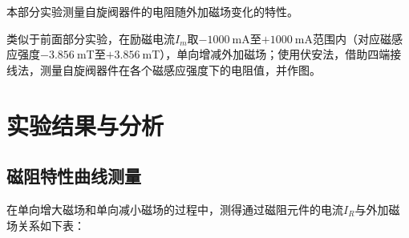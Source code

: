\documentclass{thuemp}
\begin{document}
本部分实验测量自旋阀器件的电阻随外加磁场变化的特性。

类似于前面部分实验，在励磁电流$I_m$取$-1000 ~ \mathrm{mA} $至$+1000~ \mathrm{mA} $范围内（对应磁感应强度$-3.856 ~ $\si{\milli\tesla}至$+3.856 ~ $\si{\milli\tesla}），单向增减外加磁场；使用伏安法，借助四端接线法，测量自旋阀器件在各个磁感应强度下的电阻值，并作图。


\section{实验结果与分析}

\subsection{磁阻特性曲线测量}

在单向增大磁场和单向减小磁场的过程中，测得通过磁阻元件的电流$I_R$与外加磁场关系如下表：
\end{document}
